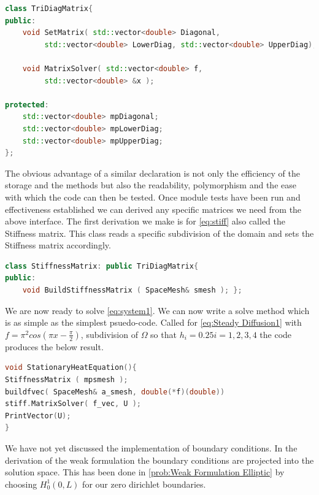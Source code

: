 \documentclass{uonmathreport}
\theoremstyle{definition}
\theoremstyle{problem}
\theoremstyle{theorem}
\begin{document}
\begin{lstlisting}[language=C++]
class TriDiagMatrix{
public:
    void SetMatrix( std::vector<double> Diagonal,
         std::vector<double> LowerDiag, std::vector<double> UpperDiag);

    void MatrixSolver( std::vector<double> f,
         std::vector<double> &x );

protected:
    std::vector<double> mpDiagonal;
    std::vector<double> mpLowerDiag;
    std::vector<double> mpUpperDiag;
};
\end{lstlisting}



The obvious advantage of a similar declaration is not only the efficiency of the storage and the methods but also the readability, polymorphism and the ease with which the code can then be tested. Once module tests have been run and effectiveness established we can derived any specific matrices we need from the above interface. The first derivation we make is for \ref{eq:stiff} also called the Stiffness matrix. This class reads a specific subdivision of the domain and sets the Stiffness matrix accordingly.

\begin{lstlisting}[language=C++]
class StiffnessMatrix: public TriDiagMatrix{
public:
    void BuildStiffnessMatrix ( SpaceMesh& smesh ); };

\end{lstlisting}

We are now ready to solve \ref{eq:system1}. We can now write a solve method which is as simple as the simplest psuedo-code. Called for \ref{eq:Steady Diffusion1} with  $f=\pi^2cos(\pi x - \frac{\pi}{2})$, subdivision of $\Omega$ so that $h_i = 0.25 i=1, 2, 3, 4$   the code produces the below result.\\

\begin{lstlisting}[language=C++]
void StationaryHeatEquation(){
StiffnessMatrix ( mpsmesh );
buildfvec( SpaceMesh& a_smesh, double(*f)(double))
stiff.MatrixSolver( f_vec, U );
PrintVector(U);
}
\end{lstlisting}

\clearpage

We have not yet discussed the implementation of boundary conditions. In the derivation of the weak formulation the boundary conditions are projected into the solution space. This has been done in \ref{prob:Weak Formulation Elliptic} by choosing $H^1_0(0, L)$ for our zero dirichlet boundaries.
\end{document}
